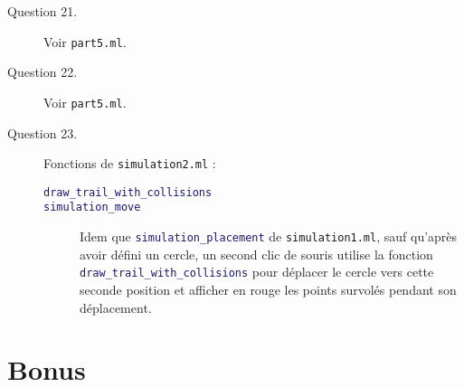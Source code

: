 \documentclass[11pt]{scrartcl}
\newcommand{\functionname}[1]{\texttt{\textcolor{MidnightBlue}{#1}}}
\newcommand{\filename}[1]{\texttt{\textcolor{RawSienna}{#1}}}
\begin{document}
\begin{description}
\item[Question 21.] Voir \filename{part5.ml}.

\item[Question 22.] Voir \filename{part5.ml}.

\item[Question 23.] Fonctions de \filename{simulation2.ml} :
\begin{description}
\item[\functionname{draw_trail_with_collisions}]
\item[\functionname{simulation_move}] Idem que \functionname{simulation_placement} de \filename{simulation1.ml}, sauf qu'après avoir défini un cercle, un second clic de souris utilise la fonction \functionname{draw_trail_with_collisions} pour déplacer le cercle vers cette seconde position et afficher en rouge les points survolés pendant son déplacement.
\end{description}
\end{description}

\break

\section*{Bonus}
\end{document}
